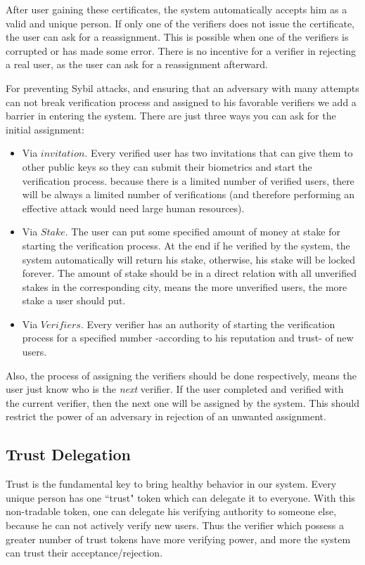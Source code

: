 \documentclass[conference]{IEEEtran}
\begin{document}
After user gaining these certificates, the system automatically accepts him as a valid and unique person. If only one of the verifiers does not issue the certificate, the user can ask for a reassignment. This is possible when one of the verifiers is corrupted or has made some error. There is no incentive for a verifier in rejecting a real user, as the user can ask for a reassignment afterward.


For preventing Sybil attacks, and ensuring that an adversary with many attempts can not break verification process and assigned to his favorable verifiers we add a barrier in entering the system. There are just three ways you can ask for the initial assignment:
\begin{itemize}
\item Via $invitation$. Every verified user has two invitations that can give them to other public keys so they can submit their biometrics and start the verification process. because there is a limited number of verified users, there will be always a limited number of verifications (and therefore performing an effective attack would need large human resources).

\item Via $Stake$. The user can put some specified amount of money at stake for starting the verification process. At the end if he verified by the system, the system automatically will return his stake, otherwise, his stake will be locked forever. The amount of stake should be in a direct relation with all unverified stakes in the corresponding city, means the more unverified users, the more stake a user should put.

\item Via $Verifiers$. Every verifier has an authority of starting the verification process for a specified number -according to his reputation and trust- of new users.
\end{itemize}

Also, the process of assigning the verifiers should be done respectively, means the user just know who is the \textit{next} verifier. If the user completed and verified with the current verifier, then the next one will be assigned by the system. This should restrict the power of an adversary in rejection of an unwanted assignment.

\subsection{Trust Delegation}
Trust is the fundamental key to bring healthy behavior in our system. Every unique person has one ``trust" token which can delegate it to everyone. With this non-tradable token, one can delegate his verifying authority to someone else, because he can not actively verify new users. Thus the verifier which possess a greater number of trust tokens have more verifying power, and more the system can trust their acceptance/rejection.
\end{document}
